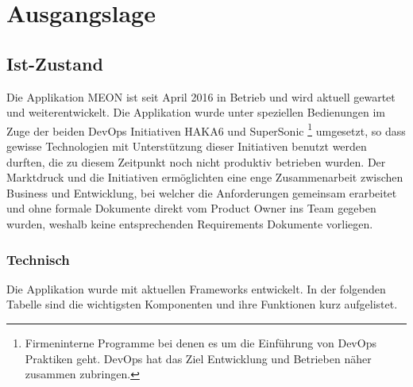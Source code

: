 \graphicspath{{./images/}}

\chapter{Ausgangslage}

\section{Ist-Zustand}

Die Applikation MEON ist seit April 2016 in Betrieb und wird aktuell gewartet und weiterentwickelt. Die Applikation wurde unter speziellen Bedienungen im Zuge der beiden DevOps Initiativen HAKA6 und SuperSonic \footnote{Firmeninterne Programme bei denen es um die Einführung von DevOps Praktiken geht. DevOps hat das Ziel Entwicklung und Betrieben näher zusammen zubringen.} umgesetzt, so dass gewisse Technologien mit Unterstützung dieser Initiativen benutzt werden durften, die zu diesem Zeitpunkt noch nicht produktiv betrieben wurden. Der Marktdruck und die Initiativen ermöglichten eine enge Zusammenarbeit zwischen Business und Entwicklung, bei welcher die Anforderungen gemeinsam erarbeitet und ohne formale Dokumente direkt vom Product Owner ins Team gegeben wurden, weshalb keine entsprechenden Requirements Dokumente vorliegen.
\newpage
\subsection{Technisch}

Die Applikation wurde mit aktuellen Frameworks entwickelt. In der folgenden Tabelle sind die wichtigsten Komponenten und ihre Funktionen kurz aufgelistet.

